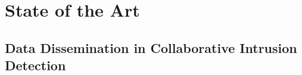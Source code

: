 \documentclass[../main.tex]{subfiles}
\begin{document}
\chapter{State of the Art}

\section{Data Dissemination in Collaborative Intrusion Detection}



\end{document}
